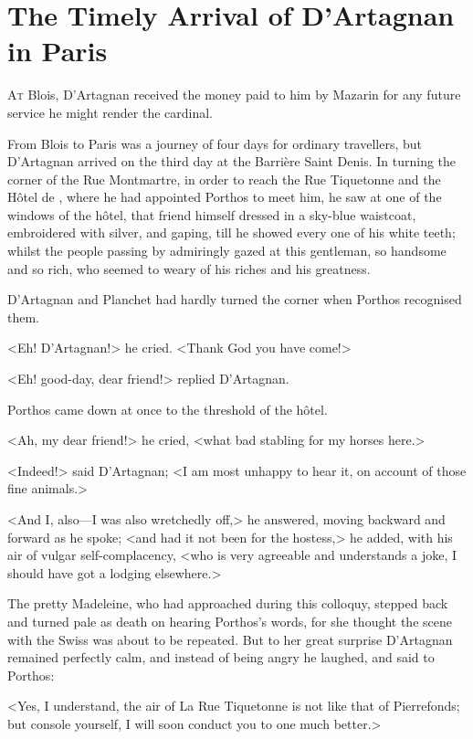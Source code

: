 \chapter{The Timely Arrival of D'Artagnan in Paris}

 \lettrine{A}{t} Blois, D'Artagnan received the money paid to him by Mazarin for any future service he might render the cardinal.

\zz
From Blois to Paris was a journey of four days for ordinary travellers, but D'Artagnan arrived on the third day at the Barrière Saint Denis. In turning the corner of the Rue Montmartre, in order to reach the Rue Tiquetonne and the Hôtel de , where he had appointed Porthos to meet him, he saw at one of the windows of the hôtel, that friend himself dressed in a sky-blue waistcoat, embroidered with silver, and gaping, till he showed every one of his white teeth; whilst the people passing by admiringly gazed at this gentleman, so handsome and so rich, who seemed to weary of his riches and his greatness.

D'Artagnan and Planchet had hardly turned the corner when Porthos recognised them.

<Eh! D'Artagnan!> he cried. <Thank God you have come!>

<Eh! good-day, dear friend!> replied D'Artagnan.

Porthos came down at once to the threshold of the hôtel.

<Ah, my dear friend!> he cried, <what bad stabling for my horses here.>

<Indeed!> said D'Artagnan; <I am most unhappy to hear it, on account of those fine animals.>

<And I, also—I was also wretchedly off,> he answered, moving backward and forward as he spoke; <and had it not been for the hostess,> he added, with his air of vulgar self-complacency, <who is very agreeable and understands a joke, I should have got a lodging elsewhere.>

The pretty Madeleine, who had approached during this colloquy, stepped back and turned pale as death on hearing Porthos's words, for she thought the scene with the Swiss was about to be repeated. But to her great surprise D'Artagnan remained perfectly calm, and instead of being angry he laughed, and said to Porthos:

<Yes, I understand, the air of La Rue Tiquetonne is not like that of Pierrefonds; but console yourself, I will soon conduct you to one much better.>

